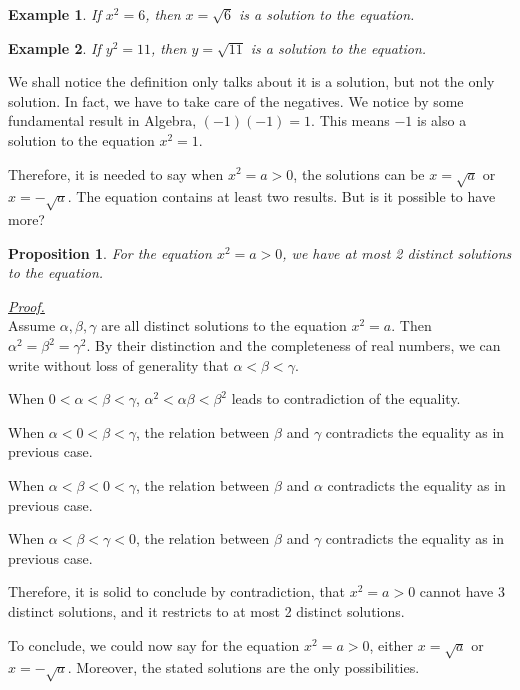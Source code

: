 \documentclass[12pt]{article}
\newtheorem*{proposition}{Proposition}
\newtheorem*{example}{Example}
\renewenvironment{proof}[1][Proof]{\begin{snugshade*} \underline{\textit{{#1}.}}\\}{\hfill \qedsymbol \end{snugshade*}}
\begin{document}
    \begin{example}
        If $x^2=6$, then $x=\sqrt{6}$ is a solution to the equation.
    \end{example}

    \begin{example}
        If $y^2=11$, then $y=\sqrt{11}$ is a solution to the equation.
    \end{example}

    We shall notice the definition only talks about it is a solution, but not the only solution. In fact, we have to take care of the negatives. We notice by some fundamental result in Algebra, $(-1)(-1)=1$. This means $-1$ is also a solution to the equation $x^2=1$.

    Therefore, it is needed to say when $x^2=a>0$, the solutions can be $x=\sqrt{a}$ or $x=-\sqrt{a}$. The equation contains at least two results. But is it possible to have more?

    \begin{proposition}
        For the equation $x^2=a>0$, we have at most 2 distinct solutions to the equation. 
    \end{proposition}

    \begin{proof}
        Assume $\alpha,\beta,\gamma$ are all distinct solutions to the equation $x^2=a$. Then $\alpha^2=\beta^2=\gamma^2$. By their distinction and the completeness of real numbers, we can write without loss of generality that $\alpha<\beta<\gamma$.

        When $0<\alpha<\beta<\gamma$, $\alpha^2<\alpha\beta<\beta^2$ leads to contradiction of the equality.

        When $\alpha<0<\beta<\gamma$, the relation between $\beta$ and $\gamma$ contradicts the equality as in previous case.

        When $\alpha<\beta<0<\gamma$, the relation between $\beta$ and $\alpha$ contradicts the equality as in previous case.

        When $\alpha<\beta<\gamma<0$, the relation between $\beta$ and $\gamma$ contradicts the equality as in previous case.

        Therefore, it is solid to conclude by contradiction, that $x^2=a>0$ cannot have 3 distinct solutions, and it restricts to at most 2 distinct solutions.
    \end{proof}

    To conclude, we could now say for the equation $x^2=a>0$, either $x=\sqrt{a}$ or $x=-\sqrt{a}$. Moreover, the stated solutions are the only possibilities.
\end{document}
